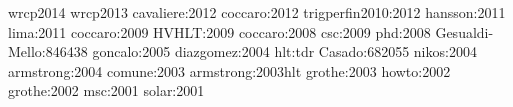 \nocite{hep_papers}{wrcp2014}
\nocite{hep_papers}{wrcp2013}
\nocite{hep_papers}{cavaliere:2012}
\nocite{hep_papers}{coccaro:2012}
\nocite{hep_papers}{trigperfin2010:2012}
\nocite{hep_papers}{hansson:2011}
\nocite{hep_papers}{lima:2011}
\nocite{hep_papers}{coccaro:2009}
\nocite{hep_papers}{HVHLT:2009}
\nocite{hep_papers}{coccaro:2008}
\nocite{hep_papers}{csc:2009}
\nocite{hep_papers}{phd:2008}
\nocite{hep_papers}{Gesualdi-Mello:846438}
\nocite{hep_papers}{goncalo:2005}
\nocite{hep_papers}{diazgomez:2004}
\nocite{hep_papers}{hlt:tdr}
\nocite{hep_papers}{Casado:682055}
\nocite{hep_papers}{nikos:2004}
\nocite{hep_papers}{armstrong:2004}
\nocite{hep_papers}{comune:2003}
\nocite{hep_papers}{armstrong:2003hlt}
\nocite{hep_papers}{grothe:2003}
\nocite{hep_papers}{howto:2002}
\nocite{hep_papers}{grothe:2002}
\nocite{hep_papers}{msc:2001}
\nocite{hep_papers}{solar:2001}
